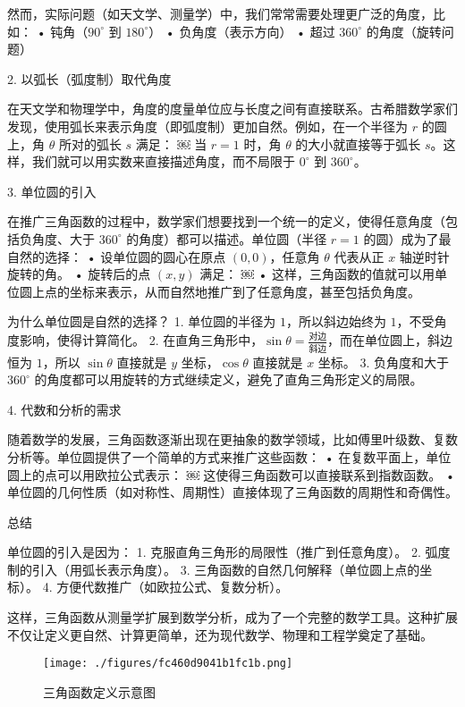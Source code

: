 然而，实际问题（如天文学、测量学）中，我们常常需要处理更广泛的角度，比如：
	•	钝角（$90^\circ$ 到 $180^\circ$）
	•	负角度（表示方向）
	•	超过 $360^\circ$ 的角度（旋转问题）



2. 以弧长（弧度制）取代角度

在天文学和物理学中，角度的度量单位应与长度之间有直接联系。古希腊数学家们发现，使用弧长来表示角度（即弧度制）更加自然。例如，在一个半径为 $r$ 的圆上，角 $\theta$ 所对的弧长 $s$ 满足：
￼
当 $r = 1$ 时，角 $\theta$ 的大小就直接等于弧长 $s$。这样，我们就可以用实数来直接描述角度，而不局限于 $0^\circ$ 到 $360^\circ$。

3. 单位圆的引入

在推广三角函数的过程中，数学家们想要找到一个统一的定义，使得任意角度（包括负角度、大于 $360^\circ$ 的角度）都可以描述。单位圆（半径 $r = 1$ 的圆）成为了最自然的选择：
	•	设单位圆的圆心在原点 $(0,0)$，任意角 $\theta$ 代表从正 $x$ 轴逆时针旋转的角。
	•	旋转后的点 $(x, y)$ 满足：
￼
	•	这样，三角函数的值就可以用单位圆上点的坐标来表示，从而自然地推广到了任意角度，甚至包括负角度。

为什么单位圆是自然的选择？
	1.	单位圆的半径为 $1$，所以斜边始终为 $1$，不受角度影响，使得计算简化。
	2.	在直角三角形中，$\sin\theta = \frac{\text{对边}}{\text{斜边}}$，而在单位圆上，斜边恒为 $1$，所以 $\sin\theta$ 直接就是 $y$ 坐标，$\cos\theta$ 直接就是 $x$ 坐标。
	3.	负角度和大于 $360^\circ$ 的角度都可以用旋转的方式继续定义，避免了直角三角形定义的局限。

4. 代数和分析的需求

随着数学的发展，三角函数逐渐出现在更抽象的数学领域，比如傅里叶级数、复数分析等。单位圆提供了一个简单的方式来推广这些函数：
	•	在复数平面上，单位圆上的点可以用欧拉公式表示：
￼
这使得三角函数可以直接联系到指数函数。
	•	单位圆的几何性质（如对称性、周期性）直接体现了三角函数的周期性和奇偶性。

总结

单位圆的引入是因为：
	1.	克服直角三角形的局限性（推广到任意角度）。
	2.	弧度制的引入（用弧长表示角度）。
	3.	三角函数的自然几何解释（单位圆上点的坐标）。
	4.	方便代数推广（如欧拉公式、复数分析）。

这样，三角函数从测量学扩展到数学分析，成为了一个完整的数学工具。这种扩展不仅让定义更自然、计算更简单，还为现代数学、物理和工程学奠定了基础。

\begin{figure}[ht]
\centering
\texttt{[image: ./figures/fc460d9041b1fc1b.png]}
\caption{三角函数定义示意图} \label{fig_HsTrFu_5}
\end{figure}


